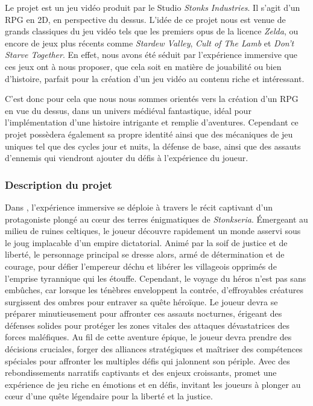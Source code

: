 
\vspace*{0.2cm}

Le projet \textit{\gameName} est un jeu vidéo produit par le Studio \textit{Stonks Industries}. Il s’agit d’un RPG en 2D, en perspective du dessus. L’idée de ce projet nous est venue de grands classiques du jeu vidéo tels que les premiers opus de la licence \textit{Zelda}, ou encore de jeux plus récents comme \textit{Stardew Valley}, \textit{Cult of The Lamb} et \textit{Don’t Starve Together}. En effet, nous avons été séduit par l'expérience immersive que ces jeux ont à nous proposer, que cela soit en matière de jouabilité ou bien d’histoire, parfait pour la création d’un jeu vidéo au contenu riche et intéressant. 

C’est donc pour cela que nous nous sommes orientés vers la création d’un RPG en vue du dessus, dans un univers médiéval fantastique, idéal pour l’implémentation d’une histoire intrigante et remplie d’aventures. Cependant ce projet possèdera également sa propre identité ainsi que des mécaniques de jeu uniques tel que des cycles jour et nuits, la défense de base, ainsi que des assauts d’ennemis qui viendront ajouter du défis à l'expérience du joueur.

\subsubsection*{\hspace*{0.6cm}Description du projet}

Dans \textit{\gameName}, l'expérience immersive se déploie à travers le récit captivant d'un protagoniste plongé au cœur des terres énigmatiques de \textit{Stonkseria}. Émergeant au milieu de ruines celtiques, le joueur découvre rapidement un monde asservi sous le joug implacable d'un empire dictatorial. Animé par la soif de justice et de liberté, le personnage principal se dresse alors, armé de détermination et de courage, pour défier l'empereur déchu et libérer les villageois opprimés de l'emprise tyrannique qui les étouffe.
Cependant, le voyage du héros n'est pas sans embûches, car lorsque les ténèbres enveloppent la contrée, d'effroyables créatures surgissent des ombres pour entraver sa quête héroïque. Le joueur devra se préparer minutieusement pour affronter ces assauts nocturnes, érigeant des défenses solides pour protéger les zones vitales des attaques dévastatrices des forces maléfiques.
Au fil de cette aventure épique, le joueur devra prendre des décisions cruciales, forger des alliances stratégiques et maîtriser des compétences spéciales pour affronter les multiples défis qui jalonnent son périple. Avec des rebondissements narratifs captivants et des enjeux croissants, \textit{\gameName} promet une expérience de jeu riche en émotions et en défis, invitant les joueurs à plonger au cœur d'une quête légendaire pour la liberté et la justice.


